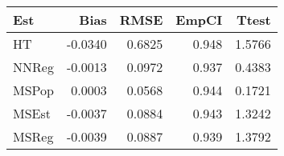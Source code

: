 
\begin{tabular}{lrrrr}
\toprule
Est & Bias & RMSE & EmpCI & Ttest\\
\midrule
HT & -0.0340 & 0.6825 & 0.948 & 1.5766\\
NNReg & -0.0013 & 0.0972 & 0.937 & 0.4383\\
MSPop & 0.0003 & 0.0568 & 0.944 & 0.1721\\
MSEst & -0.0037 & 0.0884 & 0.943 & 1.3242\\
MSReg & -0.0039 & 0.0887 & 0.939 & 1.3792\\
\bottomrule
\end{tabular}